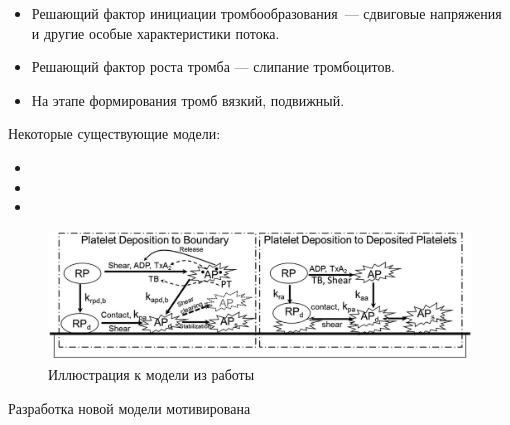 \documentclass[
    14pt,
    xcolor=dvipsnames,
    aspectratio=169
]{beamer}
\begin{document}
\begin{frame}{\secname}
    \begin{itemize}
        \item Решающий фактор инициации тромбообразования~--- сдвиговые напряжения и другие особые характеристики потока.
        \item Решающий фактор роста тромба — слипание тромбоцитов.
        \item На этапе формирования тромб вязкий, подвижный.
    \end{itemize}
\end{frame}

\begin{frame}{\secname}
    Некоторые существующие модели:
    \begin{itemize}
        \item {}
        \item {}
        \item {}
    \end{itemize}
\end{frame}

\begin{frame}{\secname}
    \centering
    \begin{figure}[ht!]
        \includegraphics[width=1.0\textwidth]{./images/slides/wu_model.png}
        \caption{Иллюстрация к модели из работы \textcite{wu2017deposition_model}}
    \end{figure}
\end{frame}

\begin{frame}{\secname}
    Разработка новой модели мотивирована
\end{frame}
\end{document}
